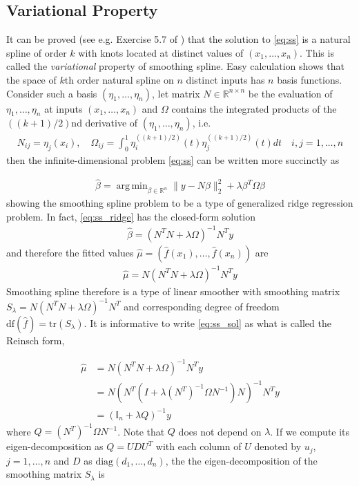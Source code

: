 \documentclass[a4paper]{article}
\DeclareMathOperator*{\argmin}{arg\,min}
\newcommand{\RR}{\mathbb{R}}
\begin{document}
\subsection{Variational Property}
\label{subsec:var_property}
It can be proved (see e.g. Exercise 5.7 of \cite{friedman2001elements}) that the solution to \eqref{eq:ss} is a natural spline of order $k$ with knots located at distinct values of $(x_1,\ldots, x_n)$. This is called the \textit{variational} property of smoothing spline\cite{anselone1968general}. Easy calculation shows that the space of $k$th order natural spline on $n$ distinct inputs has $n$ basis functions. Consider such a basis $(\eta_1,\ldots, \eta_n)$, let matrix $N\in\RR^{n\times n}$ be the evaluation of $\eta_1,\ldots, \eta_n$ at inputs $(x_1,\ldots, x_n)$ and $\Omega$ contains the integrated products of the $((k+1)/2)$nd derivative of $(\eta_1,\ldots, \eta_n)$, i.e.
\begin{align}
N_{ij} = \eta_j(x_i), \quad \Omega_{ij} = \int_0^1 \eta_i^{((k+1)/2)}(t)\eta_j^{((k+1)/2)}(t)dt \quad i,j=1,\ldots,n
\label{eq:ss_N}
\end{align}
then the infinite-dimensional problem \eqref{eq:ss} can be written more succinctly as

\begin{align}
\hat{\beta} = \argmin_{\beta\in\RR^n} \|y-N\beta\|_2^2 + \lambda\beta^T\Omega\beta
\label{eq:ss_ridge}
\end{align}
showing the smoothing spline problem to be a type of generalized ridge regression problem. In fact, \eqref{eq:ss_ridge} has the closed-form solution
\begin{align}
\hat{\beta} = (N^TN + \lambda\Omega)^{-1}N^Ty
\end{align}
and therefore the fitted values $\hat{\mu} = (\hat{f}(x_1),\ldots, \hat{f}(x_n))$ are
\begin{align}
\hat{\mu} = N(N^TN + \lambda\Omega)^{-1}N^Ty
\label{eq:ss_sol}
\end{align}
Smoothing spline therefore is a type of linear smoother with smoothing matrix $S_\lambda = N(N^TN + \lambda\Omega)^{-1}N^T$ and corresponding degree of freedom $\mbox{df}(\hat{f}) = \mbox{tr}(S_\lambda)$. It is informative to write \eqref{eq:ss_sol} as what is called the Reinsch form,

\begin{equation}
\begin{aligned}
\hat{\mu} &= N(N^TN + \lambda\Omega)^{-1}N^Ty\\
&= N(N^T(I + \lambda (N^T)^{-1}\Omega N^{-1})N)^{-1}N^Ty\\
&= (\mathbb{I}_n + \lambda Q)^{-1}y
\end{aligned}
\label{eq:ss_reinsch}
\end{equation}
where $Q =(N^T)^{-1}\Omega N^{-1}$. Note that $Q$ does not depend on $\lambda$. If we compute its eigen-decomposition as $Q = UDU^T$ with each column of $U$ denoted by $u_j$, $j=1,\ldots, n$ and $D$ as $\mbox{diag}(d_1,\ldots, d_n)$, the the eigen-decomposition of the smoothing matrix $S_\lambda$ is 
\end{document}

